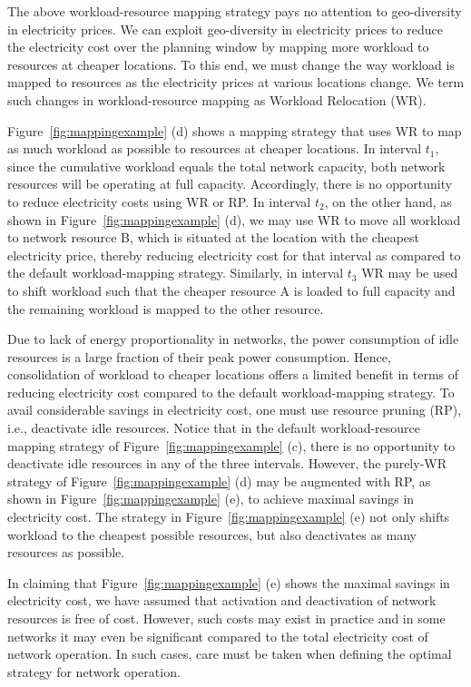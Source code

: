 The above workload-resource mapping strategy pays no attention to geo-diversity in electricity prices. We can exploit geo-diversity in electricity prices to reduce the electricity cost over the planning window by mapping more workload to resources at cheaper locations. To this end, we must change the way workload is mapped to resources as the electricity prices at various locations change. We term such changes in workload-resource mapping as Workload Relocation (WR). 

Figure~\ref{fig:mappingexample} (d) shows a mapping strategy that uses WR to map as much workload as possible to resources at cheaper locations. In interval $t_1$, since the cumulative workload equals the total network capacity, both network resources will be operating at full capacity. Accordingly, there is no opportunity to reduce electricity costs using WR or RP. In interval $t_2$, on the other hand, as shown in Figure~\ref{fig:mappingexample} (d), we may use WR to move all workload to network resource B, which is situated at the location with the cheapest electricity price, thereby reducing electricity cost for that interval as compared to the default workload-mapping strategy. Similarly, in interval $t_3$ WR may be used to shift workload such that the cheaper resource A is loaded to full capacity and the remaining workload is mapped to the other resource. 

Due to lack of energy proportionality in networks, the power consumption of idle resources is a large fraction of their peak power consumption. Hence, consolidation of workload to cheaper locations offers a limited benefit in terms of reducing electricity cost compared to the default workload-mapping strategy. To avail considerable savings in electricity cost, one must use resource pruning (RP), i.e., deactivate idle resources. Notice that in the default workload-resource mapping strategy of Figure~\ref{fig:mappingexample} (c), there is no opportunity to deactivate idle resources in any of the three intervals. However, the purely-WR strategy of Figure~\ref{fig:mappingexample} (d) may be augmented with RP, as shown in Figure~\ref{fig:mappingexample} (e), to achieve maximal savings in electricity cost. The strategy in Figure~\ref{fig:mappingexample} (e) not only shifts workload to the cheapest possible resources, but also deactivates as many resources as possible. 

In claiming that Figure~\ref{fig:mappingexample} (e) shows the maximal savings in electricity cost, we have assumed that activation and deactivation of network resources is free of cost. However, such costs may exist in practice and in some networks it may even be significant compared to the total electricity cost of network operation. In such cases, care must be taken when defining the optimal strategy for network operation. %

